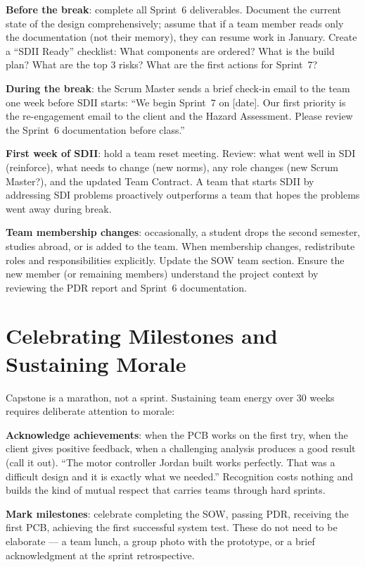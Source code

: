 \textbf{Before the break}: complete all Sprint~6 deliverables. Document the current state of the design comprehensively; assume that if a team member reads only the documentation (not their memory), they can resume work in January. Create a ``SDII Ready'' checklist: What components are ordered? What is the build plan? What are the top 3 risks? What are the first actions for Sprint~7?

\textbf{During the break}: the Scrum Master sends a brief check-in email to the team one week before SDII starts: ``We begin Sprint~7 on [date]. Our first priority is the re-engagement email to the client and the Hazard Assessment. Please review the Sprint~6 documentation before class.''

\textbf{First week of SDII}: hold a team reset meeting. Review: what went well in SDI (reinforce), what needs to change (new norms), any role changes (new Scrum Master?), and the updated Team Contract. A team that starts SDII by addressing SDI problems proactively outperforms a team that hopes the problems went away during break.

\textbf{Team membership changes}: occasionally, a student drops the second semester, studies abroad, or is added to the team. When membership changes, redistribute roles and responsibilities explicitly. Update the SOW team section. Ensure the new member (or remaining members) understand the project context by reviewing the PDR report and Sprint~6 documentation.

\section{Celebrating Milestones and Sustaining Morale}
Capstone is a marathon, not a sprint. Sustaining team energy over 30 weeks requires deliberate attention to morale:

\textbf{Acknowledge achievements}: when the PCB works on the first try, when the client gives positive feedback, when a challenging analysis produces a good result (call it out). ``The motor controller Jordan built works perfectly. That was a difficult design and it is exactly what we needed.'' Recognition costs nothing and builds the kind of mutual respect that carries teams through hard sprints.

\textbf{Mark milestones}: celebrate completing the SOW, passing PDR, receiving the first PCB, achieving the first successful system test. These do not need to be elaborate --- a team lunch, a group photo with the prototype, or a brief acknowledgment at the sprint retrospective.

